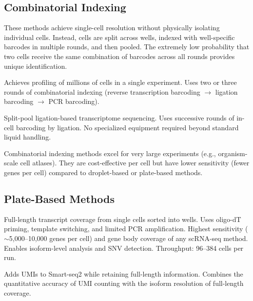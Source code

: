 \subsection{Combinatorial Indexing}

These methods achieve single-cell resolution without physically isolating
individual cells. Instead, cells are split across wells, indexed with
well-specific barcodes in multiple rounds, and then pooled. The extremely
low probability that two cells receive the same combination of barcodes across
all rounds provides unique identification.

\begin{description}[style=nextline]
  \item[sci-RNA-seq / sci-RNA-seq3] Achieves profiling of millions of cells in
    a single experiment. Uses two or three rounds of combinatorial indexing
    (reverse transcription barcoding $\rightarrow$ ligation barcoding
    $\rightarrow$ PCR barcoding).
  \item[SPLiT-seq] Split-pool ligation-based transcriptome sequencing. Uses
    successive rounds of in-cell barcoding by ligation. No specialized
    equipment required beyond standard liquid handling.
\end{description}

\begin{tipbox}
Combinatorial indexing methods excel for very large experiments (e.g.,
organism-scale cell atlases). They are cost-effective per cell but have lower
sensitivity (fewer genes per cell) compared to droplet-based or plate-based
methods.
\end{tipbox}

\subsection{Plate-Based Methods}

\begin{description}[style=nextline]
  \item[Smart-seq2] Full-length transcript coverage from single cells sorted
    into wells. Uses oligo-dT priming, template switching, and limited PCR
    amplification. Highest sensitivity ($\sim$5,000--10,000 genes per cell) and
    gene body coverage of any scRNA-seq method. Enables isoform-level analysis
    and SNV detection. Throughput: 96--384 cells per run.
  \item[Smart-seq3 / Smart-seq3xpress] Adds UMIs to Smart-seq2 while retaining
    full-length information. Combines the quantitative accuracy of UMI counting
    with the isoform resolution of full-length coverage.
\end{description}


